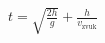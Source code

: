 \documentclass[preview]{standalone}
\begin{document}
\begin{align*}
t =  \sqrt {\frac{2h}{g}} + \frac{h}{v_{\text{zvuk}}}
\end{align*}
\end{document}
